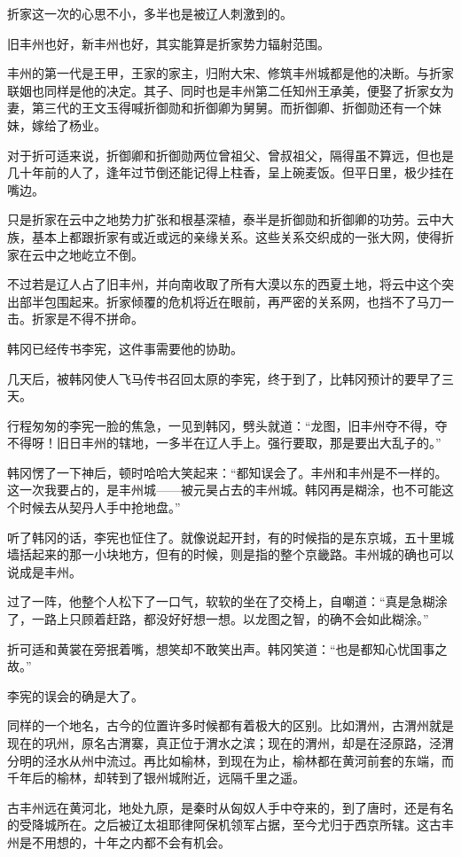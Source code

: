 折家这一次的心思不小，多半也是被辽人刺激到的。

旧丰州也好，新丰州也好，其实能算是折家势力辐射范围。

丰州的第一代是王甲，王家的家主，归附大宋、修筑丰州城都是他的决断。与折家联姻也同样是他的决定。其子、同时也是丰州第二任知州王承美，便娶了折家女为妻，第三代的王文玉得喊折御勋和折御卿为舅舅。而折御卿、折御勋还有一个妹妹，嫁给了杨业。

对于折可适来说，折御卿和折御勋两位曾祖父、曾叔祖父，隔得虽不算远，但也是几十年前的人了，逢年过节倒还能记得上柱香，呈上碗麦饭。但平日里，极少挂在嘴边。

只是折家在云中之地势力扩张和根基深植，泰半是折御勋和折御卿的功劳。云中大族，基本上都跟折家有或近或远的亲缘关系。这些关系交织成的一张大网，使得折家在云中之地屹立不倒。

不过若是辽人占了旧丰州，并向南收取了所有大漠以东的西夏土地，将云中这个突出部半包围起来。折家倾覆的危机将近在眼前，再严密的关系网，也挡不了马刀一击。折家是不得不拼命。

韩冈已经传书李宪，这件事需要他的协助。

几天后，被韩冈使人飞马传书召回太原的李宪，终于到了，比韩冈预计的要早了三天。

行程匆匆的李宪一脸的焦急，一见到韩冈，劈头就道：“龙图，旧丰州夺不得，夺不得呀！旧日丰州的辖地，一多半在辽人手上。强行要取，那是要出大乱子的。”

韩冈愣了一下神后，顿时哈哈大笑起来：“都知误会了。丰州和丰州是不一样的。这一次我要占的，是丰州城——被元昊占去的丰州城。韩冈再是糊涂，也不可能这个时候去从契丹人手中抢地盘。”

听了韩冈的话，李宪也怔住了。就像说起开封，有的时候指的是东京城，五十里城墙括起来的那一小块地方，但有的时候，则是指的整个京畿路。丰州城的确也可以说成是丰州。

过了一阵，他整个人松下了一口气，软软的坐在了交椅上，自嘲道：“真是急糊涂了，一路上只顾着赶路，都没好好想一想。以龙图之智，的确不会如此糊涂。”

折可适和黄裳在旁抿着嘴，想笑却不敢笑出声。韩冈笑道：“也是都知心忧国事之故。”

李宪的误会的确是大了。

同样的一个地名，古今的位置许多时候都有着极大的区别。比如渭州，古渭州就是现在的巩州，原名古渭寨，真正位于渭水之滨；现在的渭州，却是在泾原路，泾渭分明的泾水从州中流过。再比如榆林，到现在为止，榆林都在黄河前套的东端，而千年后的榆林，却转到了银州城附近，远隔千里之遥。

古丰州远在黄河北，地处九原，是秦时从匈奴人手中夺来的，到了唐时，还是有名的受降城所在。之后被辽太祖耶律阿保机领军占据，至今尤归于西京所辖。这古丰州是不用想的，十年之内都不会有机会。

